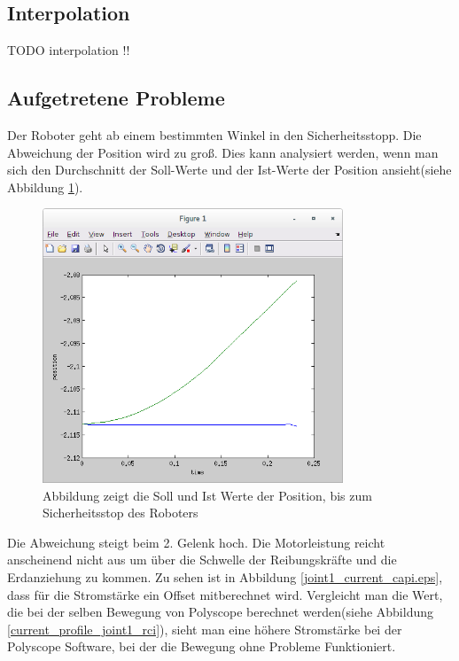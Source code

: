 \subsection{Interpolation}
\label{sub:interpolation_rel}

TODO interpolation !!

\subsection{Aufgetretene Probleme}
\label{sub:capi-problems_rel}

Der Roboter geht ab einem bestimmten Winkel in den Sicherheitsstopp. Die Abweichung der Position wird zu groß. Dies kann analysiert werden, wenn man sich den Durchschnitt der Soll-Werte und der Ist-Werte der Position ansieht(siehe Abbildung \ref{fig:position_join1}).
\\
\begin{figure}[H]
  \centering
    \includegraphics[width=0.8\textwidth]{pic/joint1_position_capi.png}
      \caption[Soll und Ist Werte der Position]{Abbildung zeigt die Soll und Ist Werte der Position, bis zum Sicherheitsstop des Roboters}
      \label{fig:position_join1}
\end{figure}

Die Abweichung steigt beim 2. Gelenk hoch. Die Motorleistung reicht anscheinend nicht aus um über die Schwelle der Reibungskräfte und die Erdanziehung zu kommen. Zu sehen ist in Abbildung \ref{joint1_current_capi.eps}, dass für die Stromstärke ein Offset mitberechnet wird. Vergleicht man die Wert, die bei der selben Bewegung von Polyscope berechnet werden(siehe Abbildung \ref{current_profile_joint1_rci}), sieht man eine höhere Stromstärke bei der Polyscope Software, bei der die Bewegung ohne Probleme Funktioniert.

